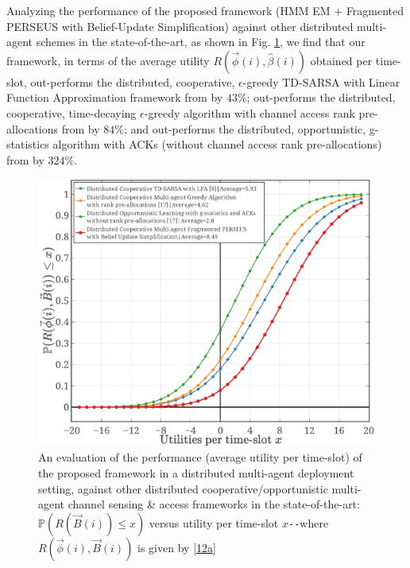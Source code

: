 \documentclass[12pt, draftcls, onecolumn]{IEEEtran}
\begin{document}
Analyzing the performance of the proposed framework (HMM EM + Fragmented PERSEUS with Belief-Update Simplification) against other distributed multi-agent schemes in the state-of-the-art, as shown in Fig. \ref{fig: Z. 2}, we find that our framework, in terms of the average utility $R(\vec{\phi}(i), \hat{\beta}(i))$ obtained per time-slot, out-performs the distributed, cooperative, $\epsilon$-greedy TD-SARSA with Linear Function Approximation framework from \cite{WCL:5} by $43$\%; out-performs the distributed, cooperative, time-decaying $\epsilon$-greedy algorithm with channel access rank pre-allocations from \cite{WCL:MIT} by $84$\%; and out-performs the distributed, opportunistic, g-statistics algorithm with ACKs (without channel access rank pre-allocations) from \cite{WCL:MIT} by $324$\%.
\begin{figure} [t]
    \centerline{
    \includegraphics[width=0.8\linewidth]{figures/Minerva_Multi_Agent_CDF_plot.png}}
    \vspace{-6mm}
    \caption{An evaluation of the performance (average utility per time-slot) of the proposed framework in a distributed multi-agent deployment setting, against other distributed cooperative/opportunistic multi-agent channel sensing \& access frameworks in the state-of-the-art: $\mathbb{P}(R(\vec{B}(i)){\leq}x)$ versus utility per time-slot $x$\texttt{-{}-}where $R(\vec{\phi}(i),\vec{B}(i))$ is given by \eqref{12a}}
    \vspace{-7mm}
    \label{fig: Z. 2}
\end{figure}
\end{document}
